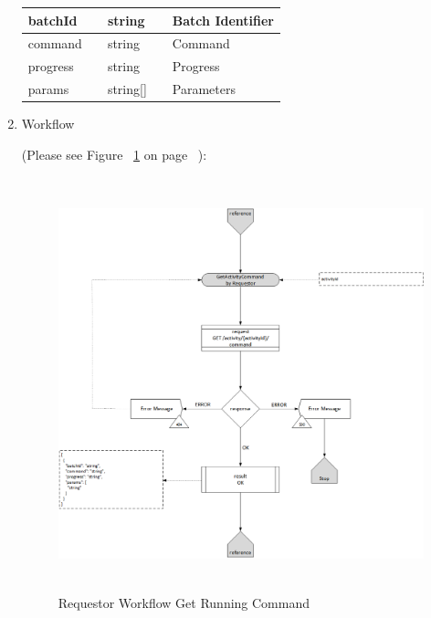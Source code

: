 \begin{enumerate}
\begin{table}[H]
\begin{center}
\begin{tabular}{|p{3cm}|l|p{3cm}|p{3cm}|p{4cm}|}
batchId		&	&	string		& 	& Batch Identifier	\\
\hline  

command		&	&	string		& 	& Command	\\
\hline

progress	&	&	string		& 	& Progress	\\
\hline

params		&	&	string[]	& 	& Parameters	\\
\hline
 
\end{tabular}
\end{center}
\end{table}

\item Workflow

(Please see Figure ~\ref{fig:RGRC} on page ~\pageref{fig:RGRC}):

\begin{figure}[H]
    \centering
    \includegraphics[width=12cm,height=12cm,angle=0]{./diag/Workflow/Activity/GetActivityCommand-R-Workflow.png}
    \caption{Requestor Workflow Get Running Command }
	\label{fig:RGRC}
\end{figure}


\end{enumerate}

\newpage



